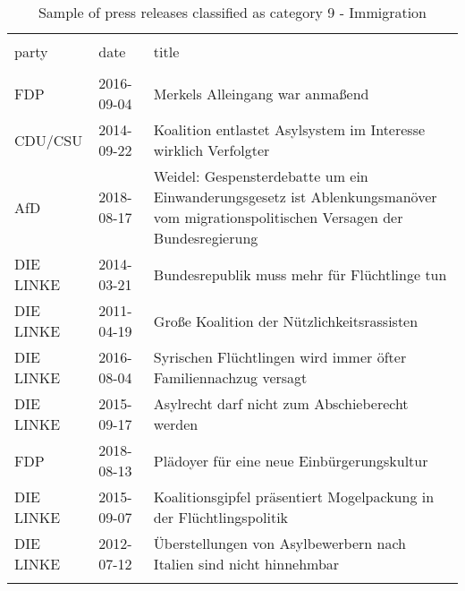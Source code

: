 
\begin{table}[!htbp] \centering 
  \caption{Sample of press releases classified as category 9 - Immigration} 
  \label{tab:7-document-samples} 
\begin{tabularx}{\textwidth}{ssX} 
\\[-1.8ex]\hline 
\hline \\[-1.8ex] 
party & date & title \\ 
\hline \\[-1.8ex] 
FDP & 2016-09-04 & Merkels Alleingang war anmaßend \\ 
CDU/CSU & 2014-09-22 & Koalition entlastet Asylsystem im Interesse wirklich Verfolgter \\ 
AfD & 2018-08-17 & Weidel: Gespensterdebatte um ein Einwanderungsgesetz ist Ablenkungsmanöver vom migrationspolitischen Versagen der Bundesregierung \\ 
DIE LINKE & 2014-03-21 & Bundesrepublik muss mehr für Flüchtlinge tun  \\ 
DIE LINKE & 2011-04-19 & Große Koalition der Nützlichkeitsrassisten \\ 
DIE LINKE & 2016-08-04 & Syrischen Flüchtlingen wird immer öfter Familiennachzug versagt \\ 
DIE LINKE & 2015-09-17 & Asylrecht darf nicht zum Abschieberecht werden \\ 
FDP & 2018-08-13 & Plädoyer für eine neue Einbürgerungskultur \\ 
DIE LINKE & 2015-09-07 & Koalitionsgipfel präsentiert Mogelpackung in der Flüchtlingspolitik  \\ 
DIE LINKE & 2012-07-12 & Überstellungen von Asylbewerbern nach Italien sind nicht hinnehmbar  \\ 
\hline \\[-1.8ex] 
\end{tabularx} 
\end{table} 
